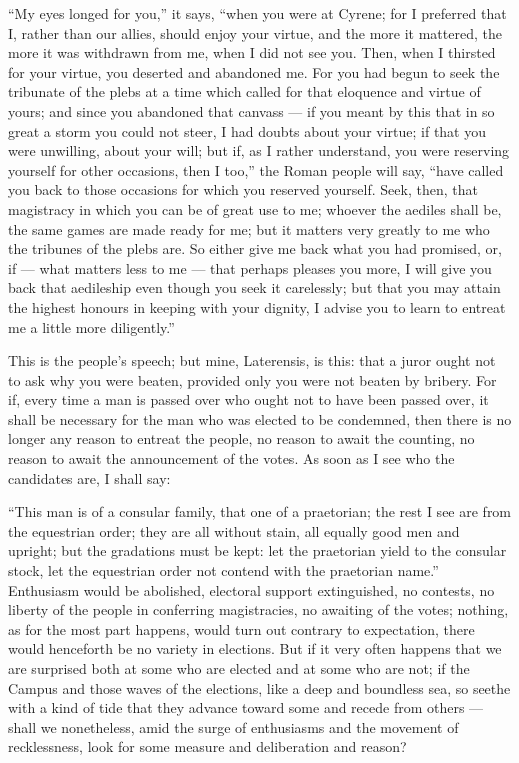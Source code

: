  ``My eyes longed for you,'' it says, ``when you were at Cyrene; for I preferred that I, rather than our allies, should enjoy your virtue, and the more it mattered, the more it was withdrawn from me, when I did not see you. Then, when I thirsted for your virtue, you deserted and abandoned me. For you had begun to seek the tribunate of the plebs at a time which called for that eloquence and virtue of yours; and since you abandoned that canvass --- if you meant by this that in so great a storm you could not steer, I had doubts about your virtue; if that you were unwilling, about your will; but if, as I rather understand, you were reserving yourself for other occasions, then I too,'' the Roman people will say, ``have called you back to those occasions for which you reserved yourself. Seek, then, that magistracy in which you can be of great use to me; whoever the aediles shall be, the same games are made ready for me; but it matters very greatly to me who the tribunes of the plebs are. So either give me back what you had promised, or, if --- what matters less to me --- that perhaps pleases you more, I will give you back that aedileship even though you seek it carelessly; but that you may attain the highest honours in keeping with your dignity, I advise you to learn to entreat me a little more diligently.''

 This is the people's speech; but mine, Laterensis, is this: that a juror ought not to ask why you were beaten, provided only you were not beaten by bribery. For if, every time a man is passed over who ought not to have been passed over, it shall be necessary for the man who was elected to be condemned, then there is no longer any reason to entreat the people, no reason to await the counting, no reason to await the announcement of the votes. As soon as I see who the candidates are, I shall say:

 ``This man is of a consular family, that one of a praetorian; the rest I see are from the equestrian order; they are all without stain, all equally good men and upright; but the gradations must be kept: let the praetorian yield to the consular stock, let the equestrian order not contend with the praetorian name.'' Enthusiasm would be abolished, electoral support extinguished, no contests, no liberty of the people in conferring magistracies, no awaiting of the votes; nothing, as for the most part happens, would turn out contrary to expectation, there would henceforth be no variety in elections. But if it very often happens that we are surprised both at some who are elected and at some who are not; if the Campus and those waves of the elections, like a deep and boundless sea, so seethe with a kind of tide that they advance toward some and recede from others --- shall we nonetheless, amid the surge of enthusiasms and the movement of recklessness, look for some measure and deliberation and reason?

